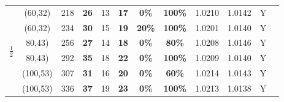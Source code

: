 \documentclass{cta-author}
\begin{document}
\begin{table}[t]
\begin{tabular}{| c|| c|c | c | c | c | c | c |c|c| c| c|}
		\hline	
		
		\multirow{6}{*}{$\frac{1}{2}$}&(60,32)&218&\textbf{26}&13&\textbf{17}&\textbf{0\%}&\textbf{100\%}&1.0210&1.0142&Y \\			
		&(60,32)&234&\textbf{30}&15&\textbf{19}&\textbf{20\%}&\textbf{100\%} &1.0201&1.0140&Y\\	
		
		&80,43)&256&\textbf{27}&14&\textbf{18}&\textbf{0\%}&\textbf{80\% }&1.0208&1.0146&Y\\
		&80,43)&292&\textbf{35}&18&\textbf{22}&\textbf{0\%}&\textbf{100\% }&1.0209&1.0140&Y\\
		
		
		&(100,53)&307&\textbf{31}&16&\textbf{20}&\textbf{0\%}&\textbf{60\%} &1.0214&1.0143&Y\\
		&(100,53)&336&\textbf{37}&19&\textbf{23}&\textbf{0\%}&\textbf{100\%} &1.0213&1.0138&Y\\		
		\hline
	\end{tabular}
	\label{table:2}
	
\end{table}
\end{document}
